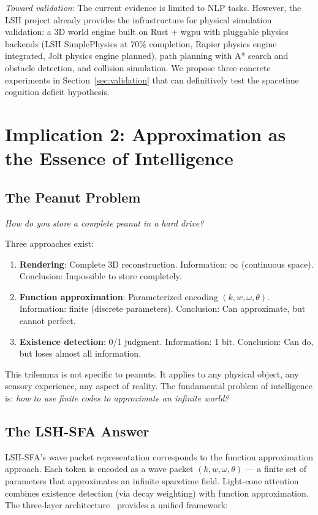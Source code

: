 \documentclass{article}
\begin{document}
\textit{Toward validation}: The current evidence is limited to NLP tasks. However, the LSH project already provides the infrastructure for physical simulation validation: a 3D world engine built on Rust + wgpu with pluggable physics backends (LSH SimplePhysics at 70\% completion, Rapier physics engine integrated, Jolt physics engine planned), path planning with A* search and obstacle detection, and collision simulation. We propose three concrete experiments in Section~\ref{sec:validation} that can definitively test the spacetime cognition deficit hypothesis.

\section{Implication 2: Approximation as the Essence of Intelligence}

\subsection{The Peanut Problem}

\textit{How do you store a complete peanut in a hard drive?}

Three approaches exist:

\begin{enumerate}
\item \textbf{Rendering}: Complete 3D reconstruction. Information: $\infty$ (continuous space). Conclusion: Impossible to store completely.
\item \textbf{Function approximation}: Parameterized encoding $(k, w, \omega, \theta)$. Information: finite (discrete parameters). Conclusion: Can approximate, but cannot perfect.
\item \textbf{Existence detection}: 0/1 judgment. Information: 1 bit. Conclusion: Can do, but loses almost all information.
\end{enumerate}

This trilemma is not specific to peanuts. It applies to any physical object, any sensory experience, any aspect of reality. The fundamental problem of intelligence is: \textit{how to use finite codes to approximate an infinite world?}

\subsection{The LSH-SFA Answer}

LSH-SFA's wave packet representation corresponds to the function approximation approach. Each token is encoded as a wave packet $(k, w, \omega, \theta)$ --- a finite set of parameters that approximates an infinite spacetime field. Light-cone attention combines existence detection (via decay weighting) with function approximation. The three-layer architecture~\citep{lsh-three-layer} provides a unified framework:
\end{document}
